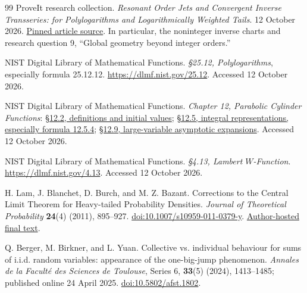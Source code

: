 \begin{thebibliography}{99}
ProveIt research collection.
\emph{Resonant Order Jets and Convergent Inverse Transseries:
for Polylogarithms and Logarithmically Weighted Tails}.
12 October 2026.
\href{https://github.com/VladimirReshetnikov/ProveIt/blob/8f5afd4d7565df808359f6a0c22f87f79a119bb9/Analysis/Transseries/docs/series-and-transseries/Polylogarithm_Resonance_And_Inverse_Transseries/polylogarithm_resonance_and_inverse_transseries.tex}{Pinned article source}.
In particular, the noninteger inverse charts and research question 9,
``Global geometry beyond integer orders.''

NIST Digital Library of Mathematical Functions.
\emph{\S25.12, Polylogarithms}, especially formula 25.12.12.
\url{https://dlmf.nist.gov/25.12}.
Accessed 12 October 2026.

NIST Digital Library of Mathematical Functions.
\emph{Chapter 12, Parabolic Cylinder Functions}:
\href{https://dlmf.nist.gov/12.2}{\S12.2, definitions and initial values};
\href{https://dlmf.nist.gov/12.5}{\S12.5, integral representations,
especially formula 12.5.4};
\href{https://dlmf.nist.gov/12.9}{\S12.9, large-variable asymptotic expansions}.
Accessed 12 October 2026.

NIST Digital Library of Mathematical Functions.
\emph{\S4.13, Lambert $W$-Function}.
\url{https://dlmf.nist.gov/4.13}.
Accessed 12 October 2026.

H. Lam, J. Blanchet, D. Burch, and M. Z. Bazant.
Corrections to the Central Limit Theorem for Heavy-tailed Probability
Densities.
\emph{Journal of Theoretical Probability} \textbf{24}(4) (2011),
895--927.
\href{https://doi.org/10.1007/s10959-011-0379-y}{doi:10.1007/s10959-011-0379-y}.
\href{https://www.columbia.edu/~khl2114/files/LBBB.pdf}{Author-hosted final text}.

Q. Berger, M. Birkner, and L. Yuan.
Collective vs. individual behaviour for sums of i.i.d. random variables:
appearance of the one-big-jump phenomenon.
\emph{Annales de la Facult\'e des Sciences de Toulouse}, Series 6,
\textbf{33}(5) (2024), 1413--1485; published online 24 April 2025.
\href{https://afst.centre-mersenne.org/articles/10.5802/afst.1802/}{doi:10.5802/afst.1802}.

\end{thebibliography}
